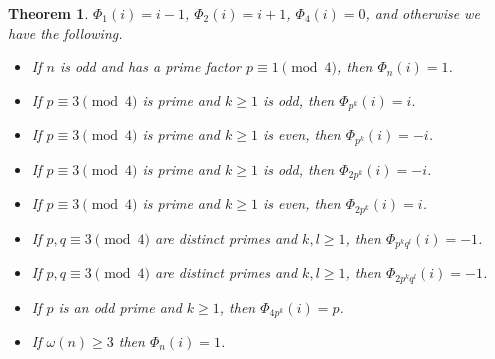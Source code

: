 \documentclass{article}
\newtheorem{theorem}{Theorem}
\theoremstyle{definition}
\begin{document}
\begin{theorem}
$\Phi_1(i)=i-1$, $\Phi_2(i) = i+1$, $\Phi_4(i)=0$, and otherwise
we have the following.

\begin{itemize}
\item If $n$ is odd and has a prime factor $p \equiv 1 \pmod{4}$, then $\Phi_n(i)=1$.
\item If $p \equiv 3 \pmod{4}$ is prime and $k \geq 1$ is odd, then
$\Phi_{p^k}(i) = i$.
\item If $p \equiv 3 \pmod{4}$ is prime and $k \geq 1$ is even, then
$\Phi_{p^k}(i) = -i$.
\item If $p \equiv 3 \pmod{4}$ is prime and $k \geq 1$ is odd, then
$\Phi_{2p^k}(i)=-i$. 
\item If $p \equiv 3 \pmod{4}$ is prime and $k \geq 1$ is even, then
$\Phi_{2p^k}(i)=i$.
\item If $p,q \equiv 3 \pmod{4}$ are distinct primes and $k, l \geq 1$, then
$\Phi_{p^k q^l}(i) = -1$.
\item If $p,q \equiv 3 \pmod{4}$ are distinct primes and $k, l \geq 1$, then
$\Phi_{2p^k q^l}(i) = -1$.
\item If $p$ is an odd prime and $k \geq 1$, then $\Phi_{4p^k}(i)=p$. 
\item If $\omega(n) \geq 3$ then $\Phi_n(i)=1$. 
\end{itemize}
\end{theorem}
\end{document}
